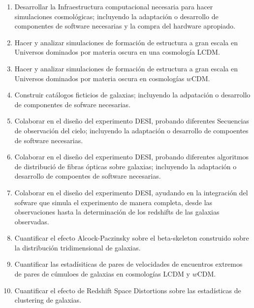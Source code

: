 \begin{enumerate}
\item Desarrollar la Infraestructura computacional necesaria para hacer simulaciones cosmol\'ogicas; incluyendo la adaptaci\'on o desarrollo de componentes de software necesarias y la compra del hardware apropiado.
\item Hacer y analizar simulaciones de formaci\'on de estructura a gran escala en Universos dominados por materia oscura en una cosmolog\'ia LCDM.
\item Hacer y analizar simulaciones de formaci\'on de estructura a gran escala en Universos dominados por materia oscura en cosmolog\'ias $w$CDM.
\item Construir cat\'alogos ficticios de galaxias; incluyendo la adpataci\'on o desarrollo de componentes de sofware necesarias.
\item Colaborar en el dise\~no del experimento DESI, probando diferentes Secuencias de observaci\'on del cielo; 
incluyendo la adaptaci\'on o desarrollo de compoentes de software necesarias.
\item Colaborar en el dise\~no del experimento DESI, probando diferentes algoritmos de distribuci\'o de fibras \'opticas sobre galaxias; incluyendo la adaptaci\'on o desarrollo de compoentes de software necesarias.
\item Colaborar en el dise\~no del experimento DESI, ayudando en la integraci\'on del sofware que simula el experimento de manera completa, desde las observaciones hasta la determinaci\'on de los redshifts de las galaxias observadas.
\item Cuantificar el efecto Alcock-Paczinsky sobre el beta-skeleton construido sobre la distribuci\'on tridimensional de galaxias.
\item Cuantificar las estad\'isiticas de pares de velocidades de encuentros extremos de pares de c\'umuloes de galaxias en cosmolog\'ias LCDM y $w$CDM.
\item Cuantificar el efecto de Redshift Space Distortions sobre las estad\'isticas de clustering de galaxias. 
\end{enumerate}


